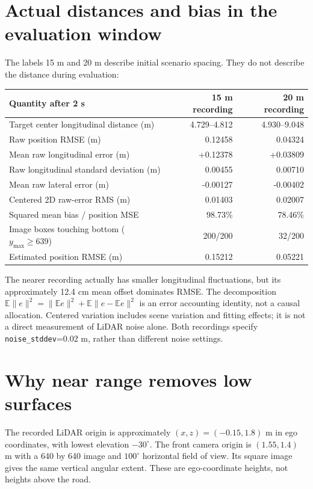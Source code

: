 \documentclass[11pt]{article}
\begin{document}
\section{Actual distances and bias in the evaluation window}
The labels 15 m and 20 m describe initial scenario spacing. They do not
describe the distance during evaluation:
\begin{center}\small
\begin{tabular}{@{}lrr@{}}\toprule
Quantity after 2 s & 15 m recording & 20 m recording \\\midrule
Target center longitudinal distance (m) & 4.729--4.812 & 4.930--9.048 \\
Raw position RMSE (m) & 0.12458 & 0.04324 \\
Mean raw longitudinal error (m) & +0.12378 & +0.03809 \\
Raw longitudinal standard deviation (m) & 0.00455 & 0.00710 \\
Mean raw lateral error (m) & -0.00127 & -0.00402 \\
Centered 2D raw-error RMS (m) & 0.01403 & 0.02007 \\
Squared mean bias / position MSE & 98.73\% & 78.46\% \\
Image boxes touching bottom ($y_{\max}\geq639$) & 200/200 & 32/200 \\
Estimated position RMSE (m) & 0.15212 & 0.05221 \\
\bottomrule\end{tabular}
\end{center}
The nearer recording actually has smaller longitudinal fluctuations, but
its approximately 12.4 cm mean offset dominates RMSE. The decomposition
$\mathbb E\|e\|^2=\|\mathbb E e\|^2+
\mathbb E\|e-\mathbb E e\|^2$ is an error accounting identity, not a causal
allocation. Centered variation includes scene variation and fitting effects;
it is not a direct measurement of LiDAR noise alone. Both recordings specify
\texttt{noise\_stddev}=0.02 m, rather than different noise settings.

\section{Why near range removes low surfaces}
The recorded LiDAR origin is approximately $(x,z)=(-0.15,1.8)$ m in ego
coordinates, with lowest elevation $-30^\circ$. The front camera origin is
$(1.55,1.4)$ m with a 640 by 640 image and $100^\circ$ horizontal field of
view. Its square image gives the same vertical angular extent. These are
ego-coordinate heights, not heights above the road.
\end{document}
